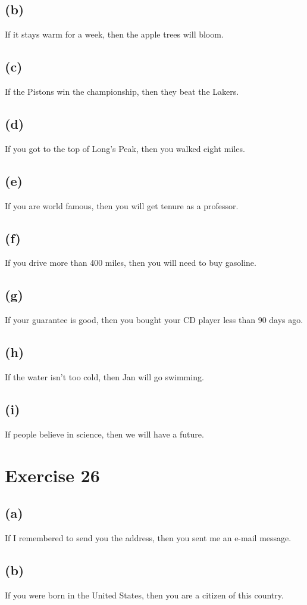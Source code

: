 \documentclass{article}
\begin{document}
\subsection{(b)}
If it stays warm for a week, then the apple trees will bloom.
\subsection{(c)}
If the Pistons win the championship, then they beat the Lakers.
\subsection{(d)}
If you got to the top of Long's Peak, then you walked eight miles.
\subsection{(e)}
If you are world famous, then you will get tenure as a professor.
\subsection{(f)}
If you drive more than 400 miles, then you will need to buy gasoline.
\subsection{(g)}
If your guarantee is good, then you bought your CD player less than 90 days ago.
\subsection{(h)}
If the water isn't too cold, then Jan will go swimming.
\subsection{(i)}
If people believe in science, then we will have a future.

\pagebreak

\section{Exercise 26}
\subsection{(a)}
If I remembered to send you the address, then you sent me an e-mail message.
\subsection{(b)}
If you were born in the United States, then you are a citizen of this country.
\end{document}
